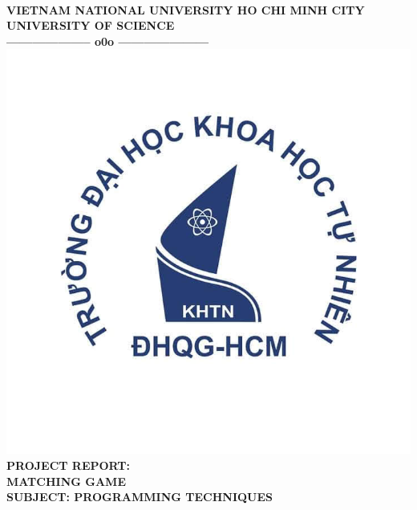 \documentclass[12pt,a4paper]{report}
\begin{document}
\thisfancypage{
	\setlength{\fboxsep}{0pt}
	\fbox}{}

\begin{center}
	{\fontsize{13pt}{1}\selectfont\textbf{                                            }}\\
	{\fontsize{13pt}{1}\selectfont\textbf{VIETNAM NATIONAL UNIVERSITY HO CHI MINH CITY}}\\[0.2cm]
	{\fontsize{13pt}{1}\selectfont\textbf{UNIVERSITY OF SCIENCE}}\\[0.2cm]
	\textbf{--------------------  o0o  ---------------------}\\[0.2cm]
	\includegraphics[scale=0.3]{logo-khtn.jpg} \\[0.1cm]
	\textbf{{\huge PROJECT REPORT:}} \\[0.5cm]
	\textbf{{\huge MATCHING GAME}}
\textbf{}\\[1cm]
\textbf{{\Large SUBJECT: PROGRAMMING TECHNIQUES}}\\[1.5cm]
\end{center}
\end{document}
